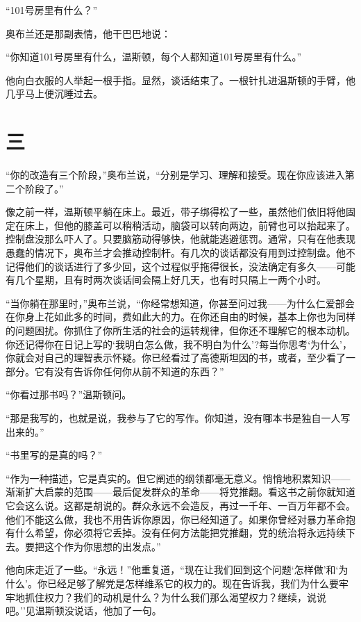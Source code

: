 ``101号房里有什么？''

奥布兰还是那副表情，他干巴巴地说：

``你知道101号房里有什么，温斯顿，每个人都知道101号房里有什么。''

他向白衣服的人举起一根手指。显然，谈话结束了。一根针扎进温斯顿的手臂，他几乎马上便沉睡过去。

\section*{三}\label{ux4e8cux5341ux4e00}

``你的改造有三个阶段，''奥布兰说，``分别是学习、理解和接受。现在你应该进入第二个阶段了。''

像之前一样，温斯顿平躺在床上。最近，带子绑得松了一些，虽然他们依旧将他固定在床上，但他的膝盖可以稍稍活动，脑袋可以转向两边，前臂也可以抬起来了。控制盘没那么吓人了。只要脑筋动得够快，他就能逃避惩罚。通常，只有在他表现愚蠢的情况下，奥布兰才会推动控制杆。有几次的谈话都没有用到过控制盘。他不记得他们的谈话进行了多少回，这个过程似乎拖得很长，没法确定有多久——可能有几个星期，且有时两次谈话间会隔上好几天，也有时只隔上一两个小时。

``当你躺在那里时，''奥布兰说，``你经常想知道，你甚至问过我——为什么仁爱部会在你身上花如此多的时间，费如此大的力。在你还自由的时候，基本上你也为同样的问题困扰。你抓住了你所生活的社会的运转规律，但你还不理解它的根本动机。你还记得你在日记上写的`我明白怎么做，我不明白为什么'?每当你思考`为什么'，你就会对自己的理智表示怀疑。你已经看过了高德斯坦因的书，或者，至少看了一部分。它有没有告诉你任何你从前不知道的东西？''

``你看过那书吗？''温斯顿问。

``那是我写的，也就是说，我参与了它的写作。你知道，没有哪本书是独自一人写出来的。''

``书里写的是真的吗？''

``作为一种描述，它是真实的。但它阐述的纲领都毫无意义。悄悄地积累知识——渐渐扩大启蒙的范围——最后促发群众的革命——将党推翻。看这书之前你就知道它会这么说。这都是胡说的。群众永远不会造反，再过一千年、一百万年都不会。他们不能这么做，我也不用告诉你原因，你已经知道了。如果你曾经对暴力革命抱有什么希望，你必须将它丢掉。没有任何方法能把党推翻，党的统治将永远持续下去。要把这个作为你思想的出发点。''

他向床走近了一些。``永远！''他重复道，``现在让我们回到这个问题`怎样做'和`为什么'。你已经足够了解党是怎样维系它的权力的。现在告诉我，我们为什么要牢牢地抓住权力？我们的动机是什么？为什么我们那么渴望权力？继续，说说吧。''见温斯顿没说话，他加了一句。

